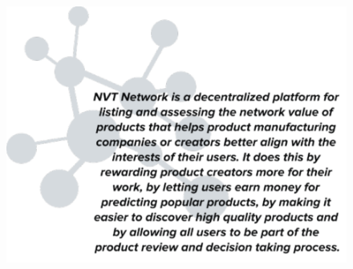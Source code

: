 \documentclass[
11pt, %
oneside, %
english, %
singlespacing, %
headsepline, %
]{MastersDoctoralThesis} %
\begin{document}
\begin{titlepage}
\begin{center}
\begin{figure}[h]
    \centering
    \includegraphics[scale=0.7]{Figures/nvt-desc}
\end{figure}
\vfill
 
\vfill
\end{center}
\end{titlepage}

\end{document}
